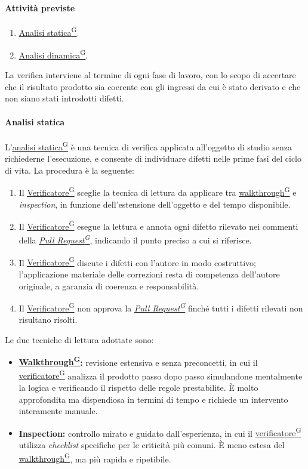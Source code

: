 \documentclass[a4paper,12pt]{article}
\providecommand{\glslink}[2]{\href{https://alittlebyte-19.github.io/Documentazione/glossario.html\#gls-#1}{\underline{#2}\textsuperscript{\scriptsize G}}}
\begin{document}
\paragraph{Attività previste}
\begin{enumerate}
    \item \glslink{analisi-statica}{Analisi statica}.
    \item \glslink{analisi-dinamica}{Analisi dinamica}.
\end{enumerate}

La verifica interviene al termine di ogni fase di lavoro, con lo scopo di accertare che il risultato prodotto sia coerente con gli ingressi da cui è stato derivato e che non siano stati introdotti difetti.

\paragraph{Analisi statica}
L'\glslink{analisi-statica}{analisi statica} è una tecnica di verifica applicata all'oggetto di studio senza richiederne l'esecuzione, e consente di individuare difetti nelle prime fasi del ciclo di vita. La procedura è la seguente:

\begin{enumerate}
    \item Il \glslink{verificatore}{Verificatore} sceglie la tecnica di lettura da applicare tra \glslink{walkthrough}{walkthrough} e \textit{inspection}, in funzione dell'estensione dell'oggetto e del tempo disponibile.
    \item Il \glslink{verificatore}{Verificatore} esegue la lettura e annota ogni difetto rilevato nei commenti della \textit{\glslink{pull-request}{Pull Request}}, indicando il punto preciso a cui si riferisce.
    \item Il \glslink{verificatore}{Verificatore} discute i difetti con l'autore in modo costruttivo; l'applicazione materiale delle correzioni resta di competenza dell'autore originale, a garanzia di coerenza e responsabilità.
    \item Il \glslink{verificatore}{Verificatore} non approva la \textit{\glslink{pull-request}{Pull Request}} finché tutti i difetti rilevati non risultano risolti.
\end{enumerate}

Le due tecniche di lettura adottate sono:
\begin{itemize}
    \item \textbf{\glslink{walkthrough}{Walkthrough}:} revisione estensiva e senza preconcetti, in cui il \glslink{verificatore}{verificatore} analizza il prodotto passo dopo passo simulandone mentalmente la logica e verificando il rispetto delle regole prestabilite. È molto approfondita ma dispendiosa in termini di tempo e richiede un intervento interamente manuale.
    \item \textbf{Inspection:} controllo mirato e guidato dall'esperienza, in cui il \glslink{verificatore}{verificatore} utilizza \textit{checklist} specifiche per le criticità più comuni. È meno estesa del \glslink{walkthrough}{walkthrough}, ma più rapida e ripetibile.
\end{itemize}
\end{document}
